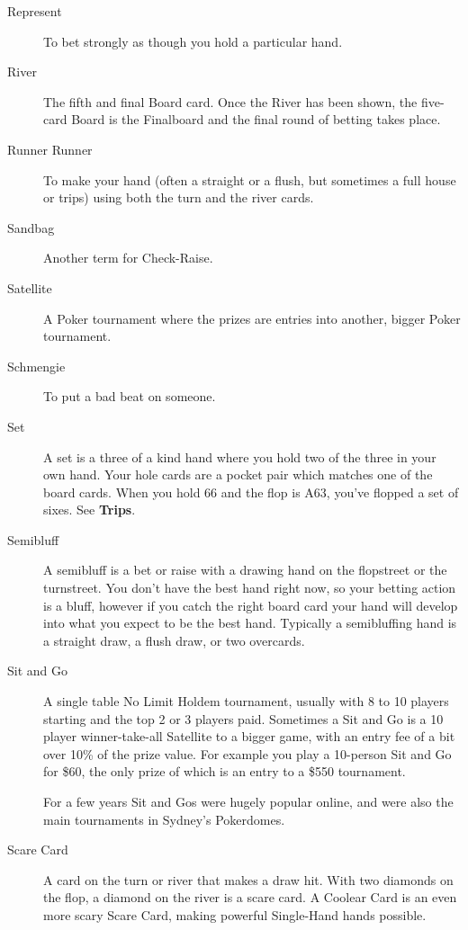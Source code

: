 \begin{description}
\item[Represent] To bet strongly as though you hold a particular hand.

\item[River] The fifth and final Board card. Once the River has been
shown, the five-card Board is the Finalboard and the final round of
betting takes place.

\item[Runner Runner] To make your hand (often a straight or a flush,
but sometimes a full house or trips) using both the turn and the
river cards.

\item[Sandbag] Another term for Check-Raise.

\item[Satellite] A Poker tournament where the prizes are entries into
another, bigger Poker tournament.

\item[Schmengie] To put a bad beat on someone.

\item[Set] A set is a three of a kind hand where you hold two of the
three in your own hand. Your hole cards are a pocket pair which
matches one of the board cards. When you hold 66 and the flop is A63,
you've flopped a set of sixes. See \textbf{Trips}.

\item[Semibluff] A semibluff is a bet or raise with a drawing hand on
the flopstreet or the turnstreet. You don't have the best hand right
now, so your betting action is a bluff, however if you catch the right
board card your hand will develop into what you expect to be the best
hand. Typically a semibluffing hand is a straight draw, a flush draw,
or two overcards.

\item[Sit and Go] A single table No Limit Holdem tournament, usually
with 8 to 10 players starting and the top 2 or 3 players
paid. Sometimes a Sit and Go is a 10 player winner-take-all
Satellite to a bigger game, with an entry fee of a
bit over 10\% of the prize value. For example you play a 10-person
Sit and Go for \$60, the only prize of which is an entry to a \$550
tournament.

For a few years Sit and Gos were hugely popular online, and were also
the main tournaments in Sydney's Pokerdomes.

\item[Scare Card] A card on the turn or river that makes a draw hit.
With two diamonds on the flop, a diamond on the river is a scare card.
A Coolear Card is an even more scary Scare Card, making powerful
Single-Hand hands possible.


\end{description}
